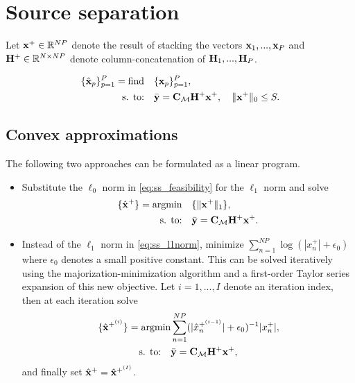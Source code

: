 \documentclass{article}
\def\x{{\mathbf x}}
\def\y{{\mathbf y}}
\begin{document}
\section*{Source separation}

Let ${\mathbf x}^+ \in {\mathbb R}^{NP}$ denote the result of stacking the vectors ${\mathbf x}_1, ..., {\mathbf x}_P$ and ${\mathbf H}^+ \in {\mathbb R}^{N \times NP}$ denote column-concatenation of ${\mathbf H}_1, ..., {\mathbf H}_P$.

\begin{align}
\label{eq:ss_feasibility}
\{\hbx_p\}_{p=1}^P=\mathop{\text{find}} \quad & \{\bbx_p\}_{p=1}^P,  \\
\text{s. to:} \quad & \bar{\y} = \bbC_{\ccalM} \bbH^+ \x^+, \quad \|\x^+\|_{0}\leq S. \nonumber
\end{align}

\subsection*{Convex approximations}

The following two approaches can be formulated as a linear program.

\begin{itemize}
  \item Substitute the $\ell_0$ norm in \eqref{eq:ss_feasibility} for the $\ell_1$ norm and solve
  \begin{align}
  \label{eq:ss_l1norm}
  \{\hbx^+\}=\text{argmin} \quad &\{\|\x^+\|_{1}\}, \\
  \text{s. to:} \quad & \bar{\y} = \bbC_{\ccalM} \bbH^+ \x^+. \nonumber
  \end{align}

  \item Instead of the $\ell_1$ norm in \eqref{eq:ss_l1norm}, minimize $\sum_{n=1}^{NP} \log(|x^+_n|+\epsilon_0)$ where $\epsilon_0$ denotes a small positive constant. This can be solved iteratively using the majorization-minimization algorithm and a first-order Taylor series expansion of this new objective. Let $i=1,...,I$ denote an iteration index, then at each iteration solve
  \begin{align}
  \label{eq:ss_mm}
  \{\hbx^{+^{(i)}}\}=\text{argmin} & \sum_{n=1}^{NP} (|\hat{x}^{+^{(i-1)}}_n| + \epsilon_0)^{-1} |x^+_n|, \\
  \text{s. to:} \quad & \bar{\y} = \bbC_{\ccalM} \bbH^+ \x^+, \nonumber
  \end{align}
    and finally set ${\hat{\mathbf x} }^+={\hat{\mathbf x} }^{+^{(I)}}$.
\end{itemize}
\end{document}
